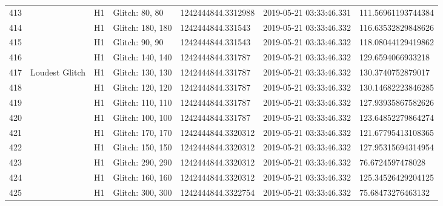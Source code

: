 \begin{longtable}{lllllll}
413  &                                                    &       H1 &    Glitch: 80, 80 &  1242444844.3312988 &  2019-05-21 03:33:46.331 &  111.56961193744384 \\
414  &                                                    &       H1 &  Glitch: 180, 180 &   1242444844.331543 &  2019-05-21 03:33:46.332 &  116.63532829848626 \\
415  &                                                    &       H1 &    Glitch: 90, 90 &   1242444844.331543 &  2019-05-21 03:33:46.332 &  118.08044129419862 \\
416  &                                                    &       H1 &  Glitch: 140, 140 &   1242444844.331787 &  2019-05-21 03:33:46.332 &   129.6594066933218 \\
417  &                                     Loudest Glitch &       H1 &  Glitch: 130, 130 &   1242444844.331787 &  2019-05-21 03:33:46.332 &   130.3740752879017 \\
418  &                                                    &       H1 &  Glitch: 120, 120 &   1242444844.331787 &  2019-05-21 03:33:46.332 &  130.14682223846285 \\
419  &                                                    &       H1 &  Glitch: 110, 110 &   1242444844.331787 &  2019-05-21 03:33:46.332 &  127.93935867582626 \\
420  &                                                    &       H1 &  Glitch: 100, 100 &   1242444844.331787 &  2019-05-21 03:33:46.332 &  123.64852279864274 \\
421  &                                                    &       H1 &  Glitch: 170, 170 &  1242444844.3320312 &  2019-05-21 03:33:46.332 &  121.67795413108365 \\
422  &                                                    &       H1 &  Glitch: 150, 150 &  1242444844.3320312 &  2019-05-21 03:33:46.332 &  127.95315694314954 \\
423  &                                                    &       H1 &  Glitch: 290, 290 &  1242444844.3320312 &  2019-05-21 03:33:46.332 &    76.6724597478028 \\
424  &                                                    &       H1 &  Glitch: 160, 160 &  1242444844.3320312 &  2019-05-21 03:33:46.332 &  125.34526429204125 \\
425  &                                                    &       H1 &  Glitch: 300, 300 &  1242444844.3322754 &  2019-05-21 03:33:46.332 &   75.68473276463132 \\

\end{longtable}
